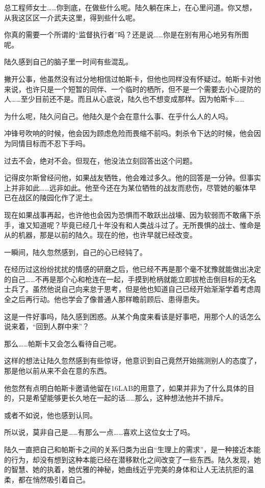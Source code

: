 总工程师女士……你到底，在做些什么呢。陆久躺在床上，在心里问道。你又想，从我这区区一介武夫这里，得到些什么呢。

你真的需要一个所谓的“监督执行者”吗？还是说……你是在别有用心地另有所图呢。

陆久感到自己的脑子里一时间有些混乱。

撇开公事，他虽然没有过分地相信过帕斯卡，但他也同样没有怀疑过。帕斯卡对他来说，也许只是一个短暂的同伴、一个临时的栖所，但不是一个需要去小心提防的人……至少目前还不是。而且从心底说，陆久也不想变成那样。因为帕斯卡……

为什么呢，陆久问自己。他陆久是个会在意什么事、在乎什么人的人吗。

冲锋号吹响的时候，他会因为顾虑危险而畏缩不前吗。刺杀令下达的时候，他会因为同情目标而不忍下手吗。

过去不会，绝对不会。但现在，他没法立刻回答出这个问题。

记得皮尔斯曾经问他，如果战友牺牲，他会难过多久。他的回答是一分钟。但事实上并非如此……远非如此。他至今还在为某位牺牲的战友而悲伤，尽管她的躯体早已在战区的陵园化作了泥土。

现在如果战事再起，也许他也会因为恐惧而不敢跃出战壕、因为软弱而不敢痛下杀手，谁又知道呢？毕竟已经几十年没有和人类战斗过了。无所畏惧的战士、惟命是从的机器，那是以前的陆久。现在的他，也许早就已经改变。

一瞬间，陆久忽然感到，自己的心已经钝了。

在经历过这纷纷扰扰的情感的研磨之后，他已经不再是那个毫不犹豫就能做出决定的自己……不再是那个心和枪连在一起，手摸到枪柄就能立即拔枪击倒目标的无名士兵了。虽然他说自己向来怠于思考，但是他也知道自己已经开始渐渐学着考虑周全之后再行动。他也学会了像普通人那样瞻前顾后、患得患失。

这是一件好事吗，陆久感到困惑。从某个角度来看该是好事吧，用那个人的话怎么说来着，“回到人群中来”？

那么……帕斯卡又会怎么看待自己呢。

这样的想法让陆久忽然感到有些惊讶，他意识到自己竟然开始揣测别人的态度了，那是他以前从来不会在意的东西。

他忽然有点明白帕斯卡邀请他留在16LAB的用意了，如果并非为了什么具体的目的，只是希望能够更长久地在一起的话……那么，这种想法他并不排斥。

或者不如说，他也感到认同。

所以说，莫非自己是……有那么一点……喜欢上这位女士了吗。

陆久一直把自己和帕斯卡之间的关系归类为出自“生理上的需求”，是一种接近本能的行为，却没有想到这种本能已经在潜移默化之间改变了一些东西。陆久发现，她的智慧、她的执着，她优雅的神秘，她曲线近乎完美的身体和让人无法抗拒的温柔，都在悄然吸引着自己。

